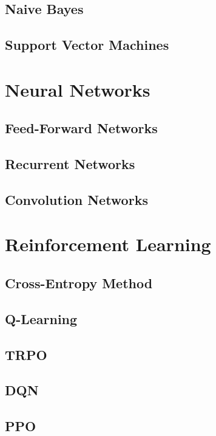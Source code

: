 \documentclass{article}
\begin{document}
\subsection{Naive Bayes}

\subsection{Support Vector Machines}


\section{Neural Networks}

\subsection{Feed-Forward Networks}

\subsection{Recurrent Networks}

\subsection{Convolution Networks}


\section{Reinforcement Learning}

\subsection{Cross-Entropy Method}

\subsection{Q-Learning}

\subsection{TRPO}

\subsection{DQN}

\subsection{PPO}
\end{document}
